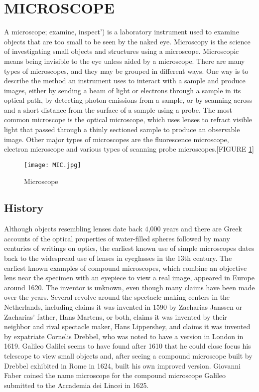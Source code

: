 \documentclass[12pt]{article}
\begin{document}
\section{MICROSCOPE}
A microscope; examine, inspect') is a laboratory instrument used to examine objects that are too small to be seen by the naked eye.
Microscopy is the science of investigating small objects and structures using a microscope.
Microscopic means being invisible to the eye unless aided by a microscope.
There are many types of microscopes, and they may be grouped in different ways.
One way is to describe the method an instrument uses to interact with a sample and produce images, either by sending a beam of light or electrons through a sample in its optical path, by detecting photon emissions from a sample, or by scanning across and a short distance from the surface of a sample using a probe.
The most common microscope is the optical microscope, which uses lenses to refract visible light that passed through a thinly sectioned sample to produce an observable image.
Other major types of microscopes are the fluorescence microscope, electron microscope and various types of scanning probe microscopes.[FIGURE \ref{fig_MIC}]
\begin{figure}[h]
\centering
\texttt{[image: MIC.jpg]}
\caption{Microscope}
\label{fig_MIC}
\end{figure}

\subsection{History}
Although objects resembling lenses date back 4,000 years and there are Greek accounts of the optical properties of water-filled spheres followed by many centuries of writings on optics, the earliest known use of simple microscopes dates back to the widespread use of lenses in eyeglasses in the 13th century.
The earliest known examples of compound microscopes, which combine an objective lens near the specimen with an eyepiece to view a real image, appeared in Europe around 1620.
The inventor is unknown, even though many claims have been made over the years.
Several revolve around the spectacle-making centers in the Netherlands, including claims it was invented in 1590 by Zacharias Janssen or Zacharias' father, Hans Martens, or both, claims it was invented by their neighbor and rival spectacle maker, Hans Lippershey, and claims it was invented by expatriate Cornelis Drebbel, who was noted to have a version in London in 1619.
Galileo Galilei seems to have found after 1610 that he could close focus his telescope to view small objects and, after seeing a compound microscope built by Drebbel exhibited in Rome in 1624, built his own improved version.
Giovanni Faber coined the name microscope for the compound microscope Galileo submitted to the Accademia dei Lincei in 1625.
\end{document}
